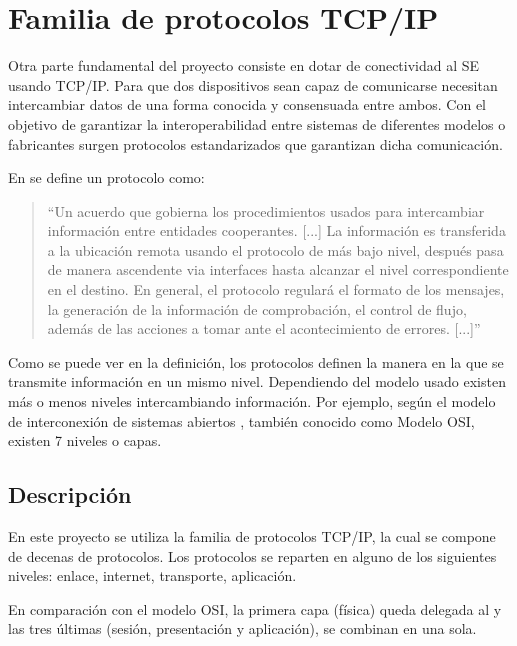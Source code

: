\section{Familia de protocolos TCP/IP}{\label{sec:tcpip}}
Otra parte fundamental del proyecto consiste en dotar de conectividad al SE
usando TCP/IP. Para que dos dispositivos sean capaz de comunicarse necesitan
intercambiar datos de una forma conocida y consensuada entre ambos. Con el
objetivo de garantizar la interoperabilidad entre sistemas de diferentes modelos
o fabricantes surgen protocolos estandarizados que garantizan dicha
comunicación.

En  \cite{butterfield2016} se define un
protocolo como:
\begin{quotation}``Un acuerdo que gobierna los procedimientos usados
  para intercambiar información entre entidades cooperantes. [...] La
  información es transferida a la ubicación remota usando el protocolo de más
  bajo nivel, después pasa de manera ascendente via interfaces hasta alcanzar el
  nivel correspondiente en el destino. En general, el protocolo regulará el
  formato de los mensajes, la generación de la información de comprobación, el
  control de flujo, además de las acciones a tomar ante el acontecimiento de
  errores. [...]''
\end{quotation}

Como se puede ver en la definición, los protocolos definen la manera en la que
se transmite información en un mismo nivel. Dependiendo del modelo usado existen
más o menos niveles intercambiando información. Por ejemplo, según el  modelo de
interconexión de sistemas abiertos \cite{itutx200}, también conocido como Modelo
OSI, existen 7 niveles o capas.

\subsection{Descripción}{\label{sec:tcpip-desc}}
En este proyecto se utiliza la familia de protocolos TCP/IP, la cual se compone 
de decenas de protocolos. Los protocolos se reparten en alguno de los siguientes
niveles: enlace, internet, transporte, aplicación.

En comparación con el modelo OSI, la primera capa (física) queda delegada al
 y las tres últimas (sesión, presentación y aplicación),
se combinan en una sola.

